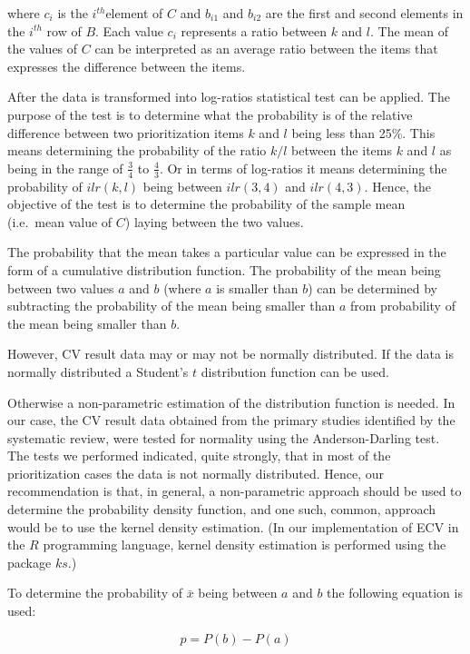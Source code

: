 where $c_{i}$ is the $i^{th}$element of $C$ and $b_{i1}$ and $b_{i2}$ are the first and second elements in the $i^{th}$ row of $B$.
Each value $c_{i}$ represents a ratio between $k$ and $l$.
The mean of the values of $C$ can be interpreted as an average ratio between the items that expresses the difference between the items.

After the data is transformed into log-ratios statistical test can be applied.
The purpose of the test is to determine what the probability is of the relative difference between two prioritization items $k$ and $l$ being less than 25\%.
This means determining the probability of the ratio $k/l$ between the items $k$ and $l$ as being in the range of $\frac{3}{4}$ to $\frac{4}{3}$. Or in terms of log-ratios it means determining the probability of $ilr(k,l)$ being between $ilr(3,4)$ and $ilr(4,3)$.
Hence, the objective of the test is to determine the probability of the sample mean (i.e.\ mean value of $C$) laying between the two values.

The probability that the mean takes a particular value can be expressed in the form of a cumulative distribution function.
The probability of the mean being between two values $a$ and $b$ (where $a$ is smaller than $b$) can be determined by subtracting the probability of the mean being smaller than $a$ from probability of the mean being smaller than $b$.

However, CV result data may or may not be normally distributed.
If the data is normally distributed a Student's $t$ distribution function can be used.

Otherwise a non-parametric estimation of the distribution function is needed.
In our case, the CV result data obtained from the primary studies identified by the systematic review, were tested for normality using the Anderson-Darling test.
The tests we performed indicated, quite strongly, that in most of the prioritization cases the data is not normally distributed.
Hence, our recommendation is that, in general, a non-parametric approach should be used to determine the probability density function, and one such, common, approach would be to use the kernel density estimation.
(In our implementation of ECV in the $R$ programming language, kernel density estimation is performed using the package $ks$.)

To determine the probability of $\bar{x}$ being between $a$ and $b$ the following equation is used:

\begin{equation}
	p=P(b)-P(a)\label{eq:mean-between-a-b}
\end{equation}

